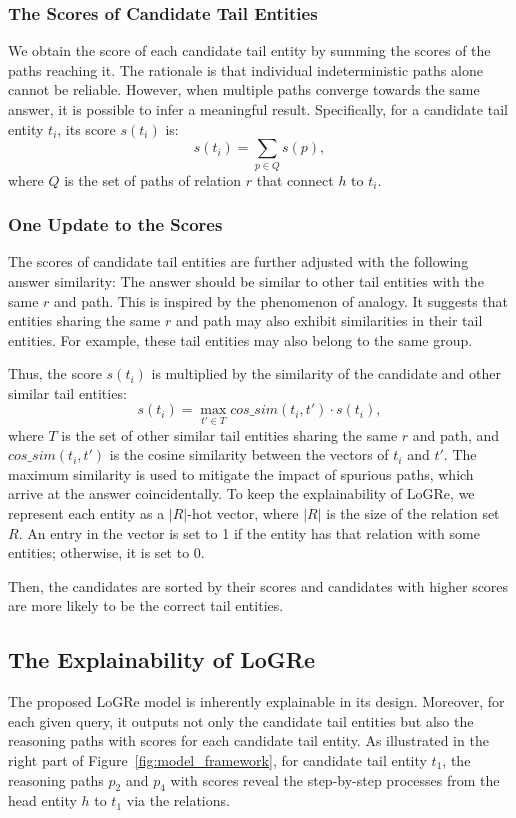 \documentclass[sigconf]{acmart}
\begin{document}
\subsubsection{The Scores of Candidate Tail Entities}
We obtain the score of each candidate tail entity by summing the scores of the paths reaching it. The rationale is that individual indeterministic paths alone cannot be reliable. However, when multiple paths converge towards the same answer, it is possible to infer a meaningful result. Specifically, for a candidate tail entity $t_i$, its score $s(t_i)$ is:
\begin{equation}
	s(t_i) = \sum_{p\in Q} s(p),
\end{equation}
where $Q$ is the set of paths of relation $r$ that connect $h$ to $t_i$.

\subsubsection{One Update to the Scores}
The scores of candidate tail entities are further adjusted with the following answer similarity: The answer should be similar to other tail entities with the same $r$ and path. This is inspired by the phenomenon of analogy. It suggests that entities sharing the same $r$ and path may also exhibit similarities in their tail entities. For example, these tail entities may also belong to the same group.

Thus, the score $s(t_i)$ is multiplied by the similarity of the candidate and other similar tail entities:
\begin{equation}
	s(t_i) = \max_{t'\in T} cos\_sim (t_i, t')\cdot s(t_i),
	\label{eq:score}
\end{equation}
where $T$ is the set of other similar tail entities sharing the same $r$ and path, and $cos\_sim(t_i, t')$ is the cosine similarity between the vectors of $t_i$ and $t'$. The maximum similarity is used to mitigate the impact of spurious paths, which arrive at the answer coincidentally. To keep the explainability of LoGRe, we represent each entity as a $|R|$-hot vector, where $|R|$ is the size of the relation set $R$. An entry in the vector is set to 1 if the entity has that relation with some entities; otherwise, it is set to 0.

Then, the candidates are sorted by their scores and candidates with higher scores are more likely to be the correct tail entities.

\subsection{The Explainability of LoGRe}
The proposed LoGRe model is inherently explainable in its design. Moreover, for each given query, it outputs not only the candidate tail entities but also the reasoning paths with scores for each candidate tail entity. As illustrated in the right part of Figure~\ref{fig:model_framework}, for candidate tail entity $t_1$, the reasoning paths $p_2$ and $p_4$ with scores reveal the step-by-step processes from the head entity $h$ to $t_1$ via the relations.
\end{document}
